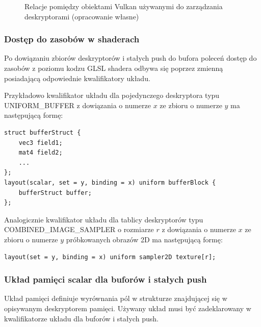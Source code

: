 \begin{figure}[H]
	\caption{Relacje pomiędzy obiektami Vulkan używanymi do zarządzania deskryptorami (opracowanie własne)}
	\label{descriptor_relations}
\end{figure}

\subsubsection{Dostęp do zasobów w shaderach}

Po dowiązaniu zbiorów deskryptorów i stałych push do bufora poleceń dostęp do zasobów z poziomu kodzu GLSL shadera odbywa się poprzez zmienną posiadającą odpowiednie kwalifikatory układu.

Przykładowo kwalifikator układu dla pojedynczego deskryptora typu UNIFORM\_BUFFER z dowiązania o numerze $x$ ze zbioru o numerze $y$ ma następującą formę:
\lstset{language=GLSL}
\begin{lstlisting}[caption={Kwalifikator układu dla bufora uniform},captionpos=b]
struct bufferStruct {
	vec3 field1;
	mat4 field2;
	...
};
layout(scalar, set = y, binding = x) uniform bufferBlock {
	bufferStruct buffer;
};
\end{lstlisting}

Analogicznie kwalifikator układu dla tablicy deskryptorów typu COMBINED\_IMAGE\_SAMPLER o rozmiarze $r$ z dowiązania o numerze $x$ ze zbioru o numerze $y$ próbkowanych obrazów 2D ma następującą formę:
\lstset{language=GLSL}
\begin{lstlisting}[caption={Kwalifikator układu dla tablicy tekstur},captionpos=b]
layout(set = y, binding = x) uniform sampler2D texture[r];
\end{lstlisting}


\subsubsection{Układ pamięci scalar dla buforów i stałych push}

Układ pamięci definiuje wyrównania pól w strukturze znajdującej się w opisywanym deskryptorem pamięci.
Używany układ musi być zadeklarowany w kwalifikatorze układu dla buforów i stałych push.

